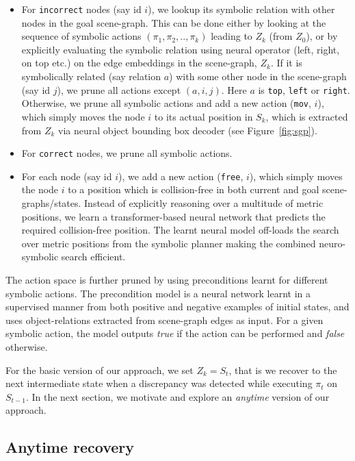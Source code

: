 \begin{itemize}
    \item For \texttt{incorrect} nodes (say id $i$), we lookup its symbolic relation with other nodes in the goal scene-graph. This can be done either by looking at the sequence of symbolic actions $(\pi_1, \pi_2, .., \pi_k)$ leading to $Z_k$ (from $Z_0$), or by explicitly evaluating the symbolic relation using neural operator (left, right, on top etc.) on the edge embeddings in the scene-graph, $Z_k$. If it is symbolically related (say relation $a$) with some other node in the scene-graph (say id $j$), we prune all actions except $(a, i, j)$. Here $a$ is \texttt{top}, \texttt{left} or \texttt{right}. Otherwise, we prune all symbolic actions and add a new action (\texttt{mov}, $i$), which simply moves the node $i$ to its actual position in $S_k$, which is extracted from $Z_k$ via neural object bounding box decoder (see Figure~\ref{fig:sgp}).
    \item For \texttt{correct} nodes, we prune all symbolic actions.
    \item For each node (say id $i$), we add a new action (\texttt{free}, $i$), which simply moves the node $i$ to a position which is collision-free in both current and goal scene-graphs/states. Instead of explicitly reasoning over a multitude of metric positions, we learn a transformer-based neural network that predicts the required collision-free position. The learnt neural model off-loads the search over metric positions from the symbolic planner making the combined neuro-symbolic search efficient.
\end{itemize}
The action space is further pruned by using preconditions learnt for different symbolic actions. The precondition model is a neural network learnt in a supervised manner from both positive and negative examples of initial states, and uses object-relations extracted from scene-graph edges as input. For a given symbolic action, the model outputs \textit{true} if the action can be performed and \textit{false} otherwise.

For the basic version of our approach, we set $Z_k = S_t$, that is we recover to the next intermediate state when a discrepancy was detected while executing $\pi_t$ on $S_{t-1}$. In the next section, we motivate and explore an \textit{anytime} version of our approach.

\subsection{Anytime recovery}

